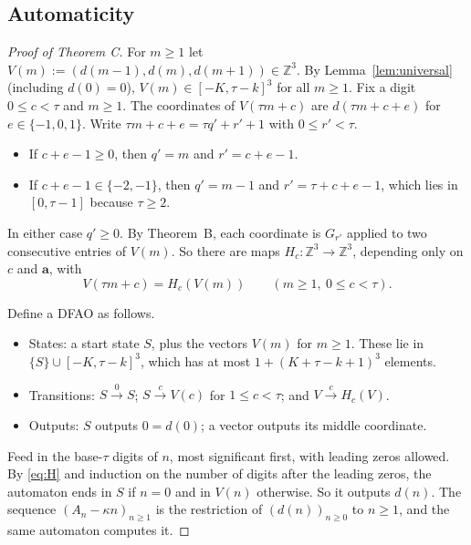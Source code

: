 \documentclass[11pt]{amsart}
\theoremstyle{definition}
\theoremstyle{remark}
\newcommand{\Z}{\mathbb{Z}}
\begin{document}
\subsection{Automaticity}
\begin{proof}[Proof of Theorem C]
For $m\ge1$ let $V(m):=(d(m-1),d(m),d(m+1))\in\Z^3$. By Lemma~\ref{lem:universal} (including $d(0)=0$), $V(m)\in[-K,\tau-k]^3$ for all $m\ge1$. Fix a digit $0\le c<\tau$ and $m\ge1$. The coordinates of $V(\tau m+c)$ are $d(\tau m+c+e)$ for $e\in\{-1,0,1\}$. Write $\tau m+c+e=\tau q'+r'+1$ with $0\le r'<\tau$.
\begin{itemize}
\item If $c+e-1\ge0$, then $q'=m$ and $r'=c+e-1$.
\item If $c+e-1\in\{-2,-1\}$, then $q'=m-1$ and $r'=\tau+c+e-1$, which lies in $[0,\tau-1]$ because $\tau\ge2$.
\end{itemize}
In either case $q'\ge0$. By Theorem~B, each coordinate is $G_{r'}$ applied to two consecutive entries of $V(m)$. So there are maps $H_c:\Z^3\to\Z^3$, depending only on $c$ and $\mathbf a$, with
\begin{equation}\label{eq:H}
V(\tau m+c)=H_c(V(m))\qquad(m\ge1,\ 0\le c<\tau).
\end{equation}

Define a DFAO as follows.
\begin{itemize}
\item States: a start state $S$, plus the vectors $V(m)$ for $m\ge1$. These lie in $\{S\}\cup[-K,\tau-k]^3$, which has at most $1+(K+\tau-k+1)^3$ elements.
\item Transitions: $S\xrightarrow{0}S$; $S\xrightarrow{c}V(c)$ for $1\le c<\tau$; and $V\xrightarrow{c}H_c(V)$.
\item Outputs: $S$ outputs $0=d(0)$; a vector outputs its middle coordinate.
\end{itemize}
Feed in the base-$\tau$ digits of $n$, most significant first, with leading zeros allowed. By \eqref{eq:H} and induction on the number of digits after the leading zeros, the automaton ends in $S$ if $n=0$ and in $V(n)$ otherwise. So it outputs $d(n)$. The sequence $(A_n-\kappa n)_{n\ge1}$ is the restriction of $(d(n))_{n\ge0}$ to $n\ge1$, and the same automaton computes it.
\end{proof}
\end{document}

